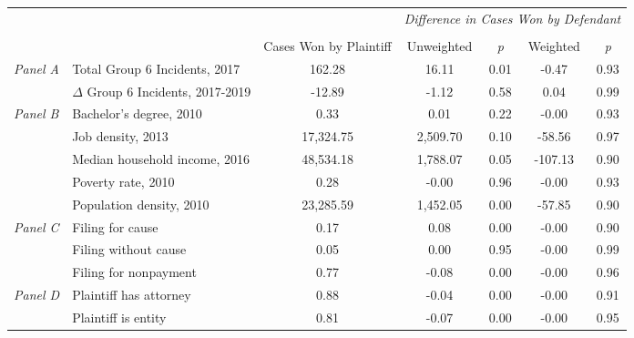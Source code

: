 \begin{tabular}{llccccc}
\toprule
 &  & \textit{} & \multicolumn{4}{c}{\textit{Difference in Cases Won by Defendant}} \\
\cline{4-7}
\\
 &  & Cases Won by Plaintiff & Unweighted & \emph{p} & Weighted & \emph{p} \\
\midrule
\multirow[c]{2}{3cm}{\textit{Panel A}} & Total Group 6 Incidents, 2017 & 162.28 & 16.11 & 0.01 & -0.47 & 0.93 \\
 & $\Delta$ Group 6 Incidents, 2017-2019 & -12.89 & -1.12 & 0.58 & 0.04 & 0.99 \\
\cline{1-7}
\multirow[c]{5}{3cm}{\textit{Panel B}} & Bachelor's degree, 2010 & 0.33 & 0.01 & 0.22 & -0.00 & 0.93 \\
 & Job density, 2013 & 17,324.75 & 2,509.70 & 0.10 & -58.56 & 0.97 \\
 & Median household income, 2016 & 48,534.18 & 1,788.07 & 0.05 & -107.13 & 0.90 \\
 & Poverty rate, 2010 & 0.28 & -0.00 & 0.96 & -0.00 & 0.93 \\
 & Population density, 2010 & 23,285.59 & 1,452.05 & 0.00 & -57.85 & 0.90 \\
\cline{1-7}
\multirow[c]{3}{3cm}{\textit{Panel C}} & Filing for cause & 0.17 & 0.08 & 0.00 & -0.00 & 0.90 \\
 & Filing without cause & 0.05 & 0.00 & 0.95 & -0.00 & 0.99 \\
 & Filing for nonpayment & 0.77 & -0.08 & 0.00 & -0.00 & 0.96 \\
\cline{1-7}
\multirow[c]{2}{3cm}{\textit{Panel D}} & Plaintiff has attorney & 0.88 & -0.04 & 0.00 & -0.00 & 0.91 \\
 & Plaintiff is entity & 0.81 & -0.07 & 0.00 & -0.00 & 0.95 \\
\cline{1-7}
\bottomrule
\end{tabular}
